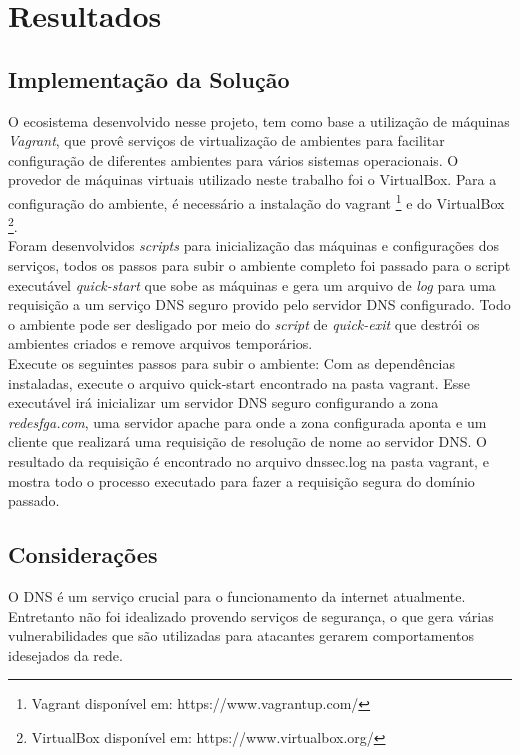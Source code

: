\documentclass[12pt,openright,a4paper]{report}
\begin{document}
{\chapter{Resultados}

\section{Implementação da Solução}
O ecosistema desenvolvido nesse projeto, tem como base a utilização de máquinas \textit{Vagrant}, que provê serviços de virtualização de ambientes para facilitar configuração de diferentes ambientes para vários sistemas operacionais. O provedor de máquinas virtuais utilizado neste trabalho foi o VirtualBox. Para a configuração do ambiente, é necessário a instalação do vagrant \footnote{Vagrant disponível em: https://www.vagrantup.com/} e do VirtualBox \footnote{VirtualBox disponível em: https://www.virtualbox.org/}.\\

Foram desenvolvidos \textit{scripts} para inicialização das máquinas e configurações dos serviços, todos os passos para subir o ambiente completo foi passado para o script executável \textit{quick-start} que sobe as máquinas e gera um arquivo de \textit{log} para uma requisição a um serviço DNS seguro provido pelo servidor DNS configurado. Todo o ambiente pode ser desligado por meio do \textit{script} de \textit{quick-exit} que destrói os ambientes criados e remove arquivos temporários.\\

Execute os seguintes passos para subir o ambiente: Com as dependências instaladas, execute o arquivo quick-start encontrado na pasta vagrant. Esse executável irá inicializar um servidor DNS seguro configurando a zona \textit{redesfga.com}, uma servidor apache para onde a zona configurada aponta e um cliente que realizará uma requisição de resolução de nome ao servidor DNS. O resultado da requisição é encontrado no arquivo dnssec.log na pasta vagrant, e mostra todo o processo executado para fazer a requisição segura do domínio passado.\\

\section{Considerações}

O DNS é um serviço crucial para o funcionamento da internet atualmente. Entretanto não foi idealizado provendo serviços de segurança, o que gera várias vulnerabilidades que são utilizadas para atacantes gerarem comportamentos idesejados da rede. \\

}
\end{document}
